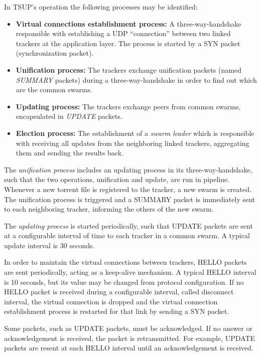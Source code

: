 In TSUP's operation the following processes may be identified:
\begin{itemize}
    \item \textbf{Virtual connections establishment process:} A
    three-way-handshake responsible with establishing a UDP ``connection''
    between two linked trackers at the application layer. The process is
    started by a SYN packet (synchronization packet).
    \item \textbf{Unification process:} The trackers exchange unification
    packets (named \textit{SUMMARY} packets) during a three-way-handshake in
    order to find out which are the common swarms.
    \item \textbf{Updating process:} The trackers exchange peers from common
    swarms, encapsulated in \textit{UPDATE} packets.
    \item \textbf{Election process:} The establishment of a \textit{swarm
    leader} which is responsible with receiving all updates from the
    neighboring linked trackers, aggregating them and sending the results
    back.
\end{itemize}

The \textit{unification process} includes an updating process in its
three-way-handshake, such that the two operations, unification and update, are
run in pipeline. Whenever a new torrent file is registered to the tracker, a
new swarm is created. The unification process is triggered and a SUMMARY
packet is immediately sent to each neighboring tracker, informing the others of the new swarm.

The \textit{updating process} is started periodically, such that UPDATE
packets are sent at a configurable interval of time to each tracker in a
common swarm. A typical update interval is 30 seconds.

In order to maintain the virtual connections between trackers, HELLO packets
are sent periodically, acting as a keep-alive mechanism. A typical HELLO
interval is 10 seconds, but its value may be changed from protocol
configuration. If no HELLO packet is received during a configurable interval,
called disconnect interval, the virtual connection is dropped and the virtual
connection establishment process is restarted for that link by sending a SYN
packet.

Some packets, such as UPDATE packets, must be acknowledged. If no answer or
acknowledgement is received, the packet is retransmitted. For example, UPDATE
packets are resent at each HELLO interval until an acknowledgement is received.

